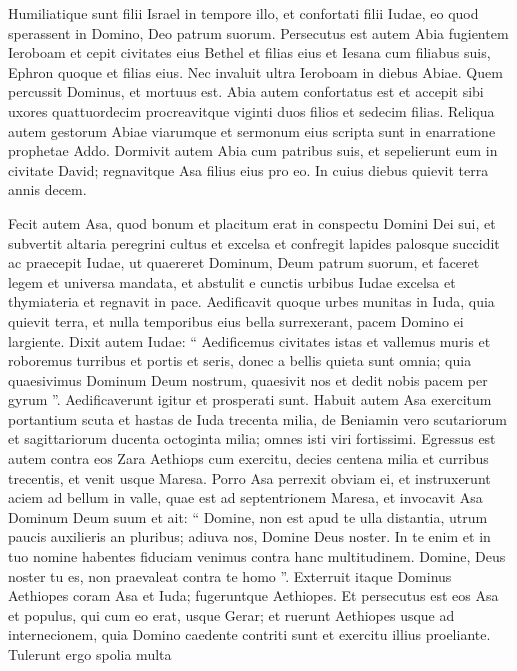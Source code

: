 \begin{biblechapter}
\begin{biblechapter}
\begin{biblechapter}
\begin{biblechapter}
\begin{biblechapter}
\begin{biblechapter}
\begin{biblechapter}
\begin{biblechapter}
\begin{biblechapter}
\begin{biblechapter}
\begin{biblechapter}
\begin{biblechapter}
\begin{biblechapter}
\verse Humiliatique sunt filii Israel in tempore illo, et confortati filii Iudae, eo quod sperassent in Domino, Deo patrum suorum. 
\verse Persecutus est autem Abia fugientem Ieroboam et cepit civitates eius Bethel et filias eius et Iesana cum filiabus suis, Ephron quoque et filias eius. 
\verse Nec invaluit ultra Ieroboam in diebus Abiae. Quem percussit Dominus, et mortuus est.
 \verse Abia autem confortatus est et accepit sibi uxores quattuordecim procreavitque viginti duos filios et sedecim filias. 
\verse Reliqua autem gestorum Abiae viarumque et sermonum eius scripta sunt in enarratione prophetae Addo. 
\verse Dormivit autem Abia cum patribus suis, et sepelierunt eum in civitate David; regnavitque Asa filius eius pro eo. In cuius diebus quievit terra annis decem.
 
\begin{biblechapter}
\verse Fecit autem Asa, quod bonum et placitum erat in conspectu Domini Dei sui, et subvertit altaria peregrini cultus et excelsa 
\verse et confregit lapides palosque succidit 
\verse ac praecepit Iudae, ut quaereret Dominum, Deum patrum suorum, et faceret legem et universa mandata, 
\verse et abstulit e cunctis urbibus Iudae excelsa et thymiateria et regnavit in pace. 
\verse Aedificavit quoque urbes munitas in Iuda, quia quievit terra, et nulla temporibus eius bella surrexerant, pacem Domino ei largiente.
 \verse Dixit autem Iudae: “ Aedificemus civitates istas et vallemus muris et roboremus turribus et portis et seris, donec a bellis quieta sunt omnia; quia quaesivimus Dominum Deum nostrum, quaesivit nos et dedit nobis pacem per gyrum ”. Aedificaverunt igitur et prosperati sunt.
 \verse Habuit autem Asa exercitum portantium scuta et hastas de Iuda trecenta milia, de Beniamin vero scutariorum et sagittariorum ducenta octoginta milia; omnes isti viri fortissimi.
 \verse Egressus est autem contra eos Zara Aethiops cum exercitu, decies centena milia et curribus trecentis, et venit usque Maresa. 
\verse Porro Asa perrexit obviam ei, et instruxerunt aciem ad bellum in valle, quae est ad septentrionem Maresa, 
 \verse et invocavit Asa Dominum Deum suum et ait: “ Domine, non est apud te ulla distantia, utrum paucis auxilieris an pluribus; adiuva nos, Domine Deus noster. In te enim et in tuo nomine habentes fiduciam venimus contra hanc multitudinem. Domine, Deus noster tu es, non praevaleat contra te homo ”.
 \verse Exterruit itaque Dominus Aethiopes coram Asa et Iuda; fugeruntque Aethiopes. 
\verse Et persecutus est eos Asa et populus, qui cum eo erat, usque Gerar; et ruerunt Aethiopes usque ad internecionem, quia Domino caedente contriti sunt et exercitu illius proeliante. Tulerunt ergo spolia multa 

\end{biblechapter}
\end{biblechapter}
\end{biblechapter}
\end{biblechapter}
\end{biblechapter}
\end{biblechapter}
\end{biblechapter}
\end{biblechapter}
\end{biblechapter}
\end{biblechapter}
\end{biblechapter}
\end{biblechapter}
\end{biblechapter}
\end{biblechapter}
